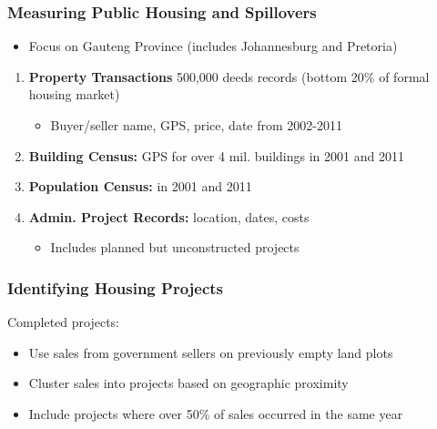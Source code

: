 \documentclass[aspectratio=149]{beamer}
\begin{document}



\begin{frame}
\frametitle{Measuring Public Housing and Spillovers}

\begin{itemize}
  \item Focus on Gauteng Province (includes Johannesburg and Pretoria)
\end{itemize}

\begin{enumerate}
\item \textbf{Property Transactions} 500,000 deeds records (bottom 20\% of formal housing market)
  \begin{itemize}
    \item Buyer/seller name, GPS, price, date from 2002-2011
  \end{itemize}
\vspace{.1cm}
\item \textbf{Building Census:} GPS for over 4 mil. buildings in 2001 and 2011
\vspace{.1cm}
\item \textbf{Population Census:} in 2001 and 2011
\vspace{.1cm}
\item \textbf{Admin. Project Records:} location, dates, costs
  \begin{itemize}
    \item Includes planned but unconstructed projects
  \end{itemize}
\end{enumerate}

\end{frame}


\begin{frame}
\frametitle{Identifying Housing Projects}

Completed projects:
\begin{itemize}
\item Use sales from government sellers on previously empty land plots
\item Cluster sales into projects based on geographic proximity
\item Include projects where over 50\% of sales occurred in the same year
\end{itemize}

\end{frame}
\end{document}
